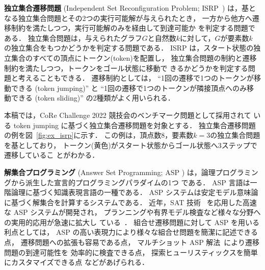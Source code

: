 \textbf{独立集合遷移問題}
(Independent Set Reconfiguration Problem; ISRP~\cite{core:ItoDHPSUU11})
は，基となる独立集合問題とその2つの実行可能解が与えられたとき，
一方から他方へ遷移制約を満たしつつ，実行可能解のみを経由して到達可能か
を判定する問題である．
独立集合問題は，与えられたグラフ$G$と自然数$k$に対して，$G$が要素数$k$
の独立集合をもつかどうかを判定する問題である．
ISRP は，スタート状態の独立集合のすべての頂点にトークン(token)を配置し，
独立集合問題の制約と遷移制約を満たしつつ，トークンをゴール状態に移動で
きるかどうかを判定する問題と考えることもできる．
遷移制約としては，
``1回の遷移で1つのトークンが移動できる (token jumping)''  と
``1回の遷移で1つのトークンが隣接頂点へのみ移動できる (token sliding)'' 
の2種類がよく用いられる．

本稿では，CoRe Challenge 2022 競技会のベンチマーク問題として採用されて
いる token jumping に基づく独立集合遷移問題を対象とする．
独立集合遷移問題の例を図~\ref{fig:ex_isrp}に示す．
この例は，頂点数8，要素数$k=3$の独立集合問題を基としており，
トークン(黄色)がスタート状態からゴール状態へ3ステップで遷移しているこ
とがわかる．

\textbf{解集合プログラミング}
(Answer Set Programming; ASP \cite{%
  Gelfond88:iclp,
  Niemela99:amai,
  Baral03:cambridge,
  Inoue08:jssst})
は，論理プログラミングから派生した宣言的プログラミングパラダイムの1つ
である．
ASP 言語は一階論理に基づく知識表現言語の一種である．
ASP システムは安定モデル意味論に基づく解集合を計算するシステムである．
近年，SAT 技術~\cite{Knuth:TAOCP:SAT}
を応用した高速な ASP システムが開発され，
プランニングや有界モデル検査など様々な分野への実用的応用が急速に拡大し
ている~\cite{Erdem16:AI}．
%
組合せ遷移問題に対して ASP を用いる利点としては，
ASP の高い表現力により様々な組合せ問題を簡潔に記述できる点，
遷移問題への拡張も容易である点，
マルチショット ASP 解法~\cite{GebserKKS19}により遷移問題の到達可能性を
効率的に検査できる点，
探索ヒューリスティックスを簡単にカスタマイズできる点
などがあげられる．

